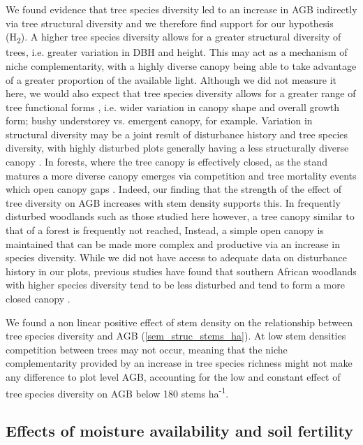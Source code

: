 \documentclass[11pt,a4paper]{article}
\newcommand{\textapprox}{\raisebox{0.5ex}{\texttildelow}}  %
\begin{document}
We found evidence that tree species diversity led to an increase in AGB indirectly via tree structural diversity and we therefore find support for our hypothesis (H\textsubscript{2}). A higher tree species diversity allows for a greater structural diversity of trees, i.e. greater variation in DBH and height. This may act as a mechanism of niche complementarity, with a highly diverse canopy being able to take advantage of a greater proportion of the available light. Although we did not measure it here, we would also expect that tree species diversity allows for a greater range of tree functional forms \citep{}, i.e. wider variation in canopy shape and overall growth form; bushy understorey vs. emergent canopy, for example. Variation in structural diversity may be a joint result of disturbance history and tree species diversity, with highly disturbed plots generally having a less structurally diverse canopy \citep{LaRue2019}. In forests, where the tree canopy is effectively closed, as the stand matures a more diverse canopy emerges via competition and tree mortality events which open canopy gaps \citep{Muscolo2014}. Indeed, our finding that the strength of the effect of tree diversity on AGB increases with stem density supports this. In frequently disturbed woodlands such as those studied here however, a tree canopy similar to that of a forest is frequently not reached, Instead, a simple open canopy is maintained that can be made more complex and productive via an increase in species diversity. While we did not have access to adequate data on disturbance history in our plots, previous studies have found that southern African woodlands with higher species diversity tend to be less disturbed and tend to form a more closed canopy \citep{Chidumayo2013, Mutowo2012}.

We found a non linear positive effect of stem density on the relationship between tree species diversity and AGB (\autoref{sem_struc_stems_ha}). At low stem densities competition between trees may not occur, meaning that the niche complementarity provided by an increase in tree species richness might not make any difference to plot level AGB, accounting for the low and constant effect of tree species diversity on AGB below \textapprox{}180 stems ha\textsuperscript{-1}.

\subsection*{Effects of moisture availability and soil fertility}
\end{document}
